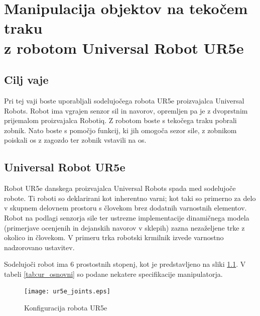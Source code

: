 \graphicspath{{../}{./}{./slike_UR/}}
\chapter{Manipulacija objektov na tekočem traku \\z robotom Universal Robot UR5e}\label{Pog:UR}


\section{Cilj vaje}
Pri tej vaji boste uporabljali sodelujočega robota UR5e proizvajalca Universal Robots. Robot ima vgrajen senzor sil in navorov, opremljen pa je z dvoprstnim prijemalom proizvajalca Robotiq. Z robotom boste s tekočega traku pobrali zobnik. Nato boste s pomočjo funkcij, ki jih omogoča sezor sile, z zobnikom poiskali os z zagozdo ter zobnik vstavili na os.


\section{Universal Robot UR5e}

Robot UR5e danskega proizvajalca Universal Robots spada med sodelujoče robote. Ti roboti so deklarirani kot inherentno varni; kot taki so primerno za delo v skupnem delovnem prostoru s človekom brez dodatnih varnostnih elementov. Robot na podlagi senzorja sile ter ustrezne implementacije dinamičnega modela (primerjave ocenjenih in dejanskih navorov v sklepih) zazna nezaželjene trke z okolico in človekom. V primeru trka robotski krmilnik izvede varnostno nadzorovano ustavitev.

Sodelujoči robot ima 6 prostostnih stopenj, kot je predstavljeno na sliki \ref{fig:ur_conf}. V tabeli \ref{tab:ur_osnovni} so podane nekatere specifikacije manipulatorja.


\begin{figure}[!hbt]
\centering
\texttt{[image: ur5e\_joints.eps]}
\caption{Konfiguracija robota UR5e}
\label{fig:ur_conf}
\end{figure}

